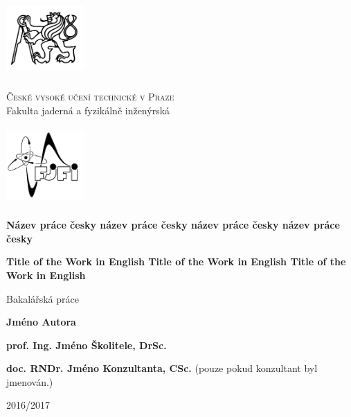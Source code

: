 \documentclass[a4paper,11pt]{book}
\begin{document}
\def\documentdate{7. července 2017}

\pagestyle{empty}
\begin{center}
	\begin{minipage}{3cm}
		\includegraphics[width=3cm,height=3cm,keepaspectratio]{images/titlepage/cvut}
	\end{minipage}
	\begin{minipage}{0.6\linewidth}
		\begin{center}
			\textsc{\large České vysoké učení technické v Praze}\\
			{\large Fakulta jaderná a fyzikálně inženýrská}
		\end{center}
	\end{minipage}
	\begin{minipage}{3cm}
		\includegraphics[width=3cm,height=3cm,keepaspectratio]{images/titlepage/fjfi}
	\end{minipage}

	\vspace{3.3cm}

	\textbf{\huge Název práce česky název práce česky název práce česky název práce česky}
	\vspace{1.1cm}

	\textenglish{\textbf{\huge Title of the Work in English Title of the Work in English Title of the Work in English}}
	\vspace{1.7cm}

	{\large Bakalářská práce}
\end{center}

\vfill

\begin{list}{}{
	\settowidth{\labelwidth}{MMMMMMMMM}
	\setlength{\leftmargin}{\labelwidth}
	\renewcommand{\makelabel}[1]{#1\hfil}}
	\item [{Autor:}] \textbf{Jméno Autora}
	\item [{Vedoucí práce:}] \textbf{prof. Ing. Jméno Školitele, DrSc.}
	\item [{Konzultant:}] \textbf{doc. RNDr. Jméno Konzultanta, CSc. }(pouze pokud konzultant byl jmenován.)
	\item [{Akademický rok:}] 2016/2017
\end{list}
\end{document}
